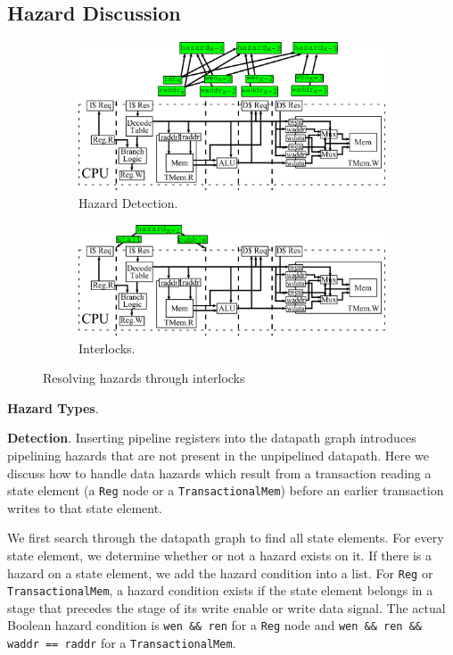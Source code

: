\subsection{Hazard Discussion}
\begin{figure}[htb]
\centering
  \begin{subfigure}[t]{0.8\textwidth}
  \centering
  \includegraphics[width=\textwidth]{figures/pipelinehazard.pdf}
  \caption{Hazard Detection.}
  \label{fig:haz}
  \end{subfigure}
  \begin{subfigure}[t]{0.8\textwidth}
  \vspace{20pt}
  \centering
  \includegraphics[width=\textwidth]{figures/pipelineinterlock.pdf}
  \caption{Interlocks.}
  \label{fig:int}
  \end{subfigure}
\caption{Resolving hazards through interlocks}
\label{fig:hazint}
\end{figure}

{\bf Hazard Types}.

{\bf Detection}. Inserting pipeline registers into the datapath
graph introduces pipelining hazards that are not present in the
unpipelined datapath. Here we discuss how to handle data hazards which
result from a transaction reading a state element (a {\tt Reg} node or a
{\tt TransactionalMem}) before an earlier transaction writes to that state
element. 

We first search through the datapath graph to find all state
elements. For every state element, we determine whether or not a
hazard exists on it. If there is a hazard on a state element, we add
the hazard condition into a list. For {\tt Reg} or {\tt TransactionalMem}, a
hazard condition exists if the state element belongs in a stage that precedes the
stage of its write enable or write data signal. The actual Boolean
hazard condition is {\tt wen \&\& ren} for a {\tt Reg} node and
{\tt wen \&\& ren \&\& waddr == raddr} for a {\tt TransactionalMem}.

